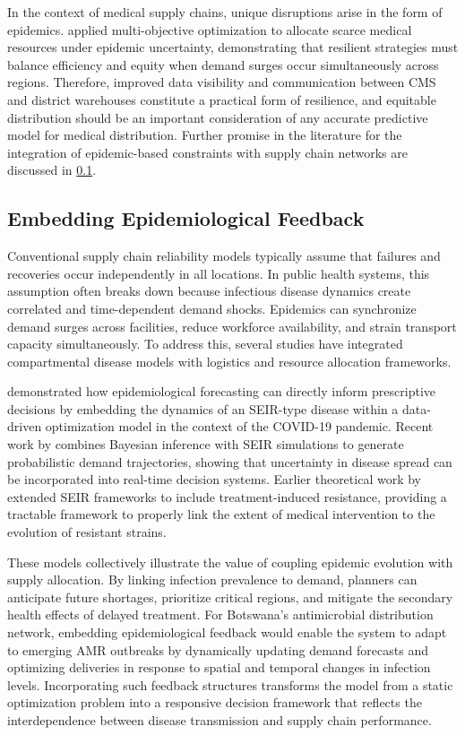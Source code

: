 \documentclass{article}
\begin{document}
In the context of medical supply chains, unique disruptions arise in the form of epidemics. \cite{govindan20} applied multi-objective optimization to allocate scarce medical resources under epidemic uncertainty, demonstrating that resilient strategies must balance efficiency and equity when demand surges occur simultaneously across regions. Therefore, improved data visibility and communication between CMS and district warehouses constitute a practical form of resilience, and equitable distribution should be an important consideration of any accurate predictive model for medical distribution. Further promise in the literature for the integration of epidemic-based constraints with supply chain networks are discussed in \ref{sec:twopointsix}.

\subsection{Embedding Epidemiological Feedback}
\label{sec:twopointsix}

Conventional supply chain reliability models typically assume that failures and recoveries occur independently in all locations. In public health systems, this assumption often breaks down because infectious disease dynamics create correlated and time-dependent demand shocks. Epidemics can synchronize demand surges across facilities, reduce workforce availability, and strain transport capacity simultaneously. To address this, several studies have integrated compartmental disease models with logistics and resource allocation frameworks.

\cite{bertsimas21} demonstrated how epidemiological forecasting can directly inform prescriptive decisions by embedding the dynamics of an SEIR-type disease within a data-driven optimization model in the context of the COVID-19 pandemic. Recent work by \cite{gpt23}  combines Bayesian inference with SEIR simulations to generate probabilistic demand trajectories, showing that uncertainty in disease spread can be incorporated into real-time decision systems. Earlier theoretical work by \cite{kd20} extended SEIR frameworks to include treatment-induced resistance, providing a tractable framework to properly link the extent of medical intervention to the evolution of resistant strains.

These models collectively illustrate the value of coupling epidemic evolution with supply allocation. By linking infection prevalence to demand, planners can anticipate future shortages, prioritize critical regions, and mitigate the secondary health effects of delayed treatment. For Botswana’s antimicrobial distribution network, embedding epidemiological feedback would enable the system to adapt to emerging AMR outbreaks by dynamically updating demand forecasts and optimizing deliveries in response to spatial and temporal changes in infection levels. Incorporating such feedback structures transforms the model from a static optimization problem into a responsive decision framework that reflects the interdependence between disease transmission and supply chain performance.
\end{document}
